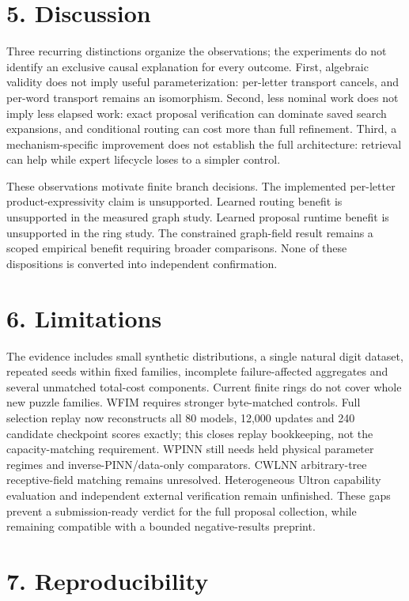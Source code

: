 \documentclass[
  11pt,
  a4paper,
]{article}
\begin{document}
\section{5. Discussion}\label{discussion}

Three recurring distinctions organize the observations; the experiments
do not identify an exclusive causal explanation for every outcome.
First, algebraic validity does not imply useful parameterization:
per-letter transport cancels, and per-word transport remains an
isomorphism. Second, less nominal work does not imply less elapsed work:
exact proposal verification can dominate saved search expansions, and
conditional routing can cost more than full refinement. Third, a
mechanism-specific improvement does not establish the full architecture:
retrieval can help while expert lifecycle loses to a simpler control.

These observations motivate finite branch decisions. The implemented
per-letter product-expressivity claim is unsupported. Learned routing
benefit is unsupported in the measured graph study. Learned proposal
runtime benefit is unsupported in the ring study. The constrained
graph-field result remains a scoped empirical benefit requiring broader
comparisons. None of these dispositions is converted into independent
confirmation.

\section{6. Limitations}\label{limitations}

The evidence includes small synthetic distributions, a single natural
digit dataset, repeated seeds within fixed families, incomplete
failure-affected aggregates and several unmatched total-cost components.
Current finite rings do not cover whole new puzzle families. WFIM
requires stronger byte-matched controls. Full selection replay now
reconstructs all 80 models, 12,000 updates and 240 candidate checkpoint
scores exactly; this closes replay bookkeeping, not the
capacity-matching requirement. WPINN still needs held physical parameter
regimes and inverse-PINN/data-only comparators. CWLNN arbitrary-tree
receptive-field matching remains unresolved. Heterogeneous Ultron
capability evaluation and independent external verification remain
unfinished. These gaps prevent a submission-ready verdict for the full
proposal collection, while remaining compatible with a bounded
negative-results preprint.

\section{7. Reproducibility}\label{reproducibility}
\end{document}
